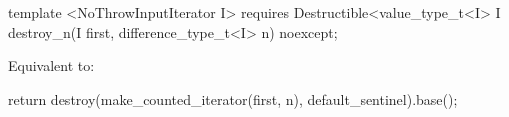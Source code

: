 {\color{addclr}
\begin{codeblock}
template <NoThrowInputIterator I>
requires
  Destructible<value_type_t<I>
I destroy_n(I first, difference_type_t<I> n) noexcept;
\end{codeblock}

\pnum
\effects Equivalent to:
\begin{codeblock}
    return destroy(make_counted_iterator(first, n), default_sentinel{}).base();
\end{codeblock}
} %